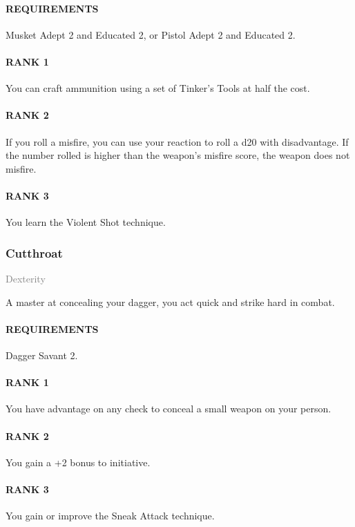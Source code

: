 \paragraph{REQUIREMENTS} Musket Adept 2 and Educated 2, or Pistol Adept 2 and Educated 2.
\paragraph{RANK 1} You can craft ammunition using a set of Tinker's Tools at half the cost.
\paragraph{RANK 2} If you roll a misfire, you can use your reaction to roll a d20 with disadvantage.
If the number rolled is higher than the weapon's misfire score, the weapon does not misfire.
\paragraph{RANK 3} You learn the Violent Shot technique.

\subsubsection{Cutthroat} \label{feat::cutthroat}
\small{\textcolor{gray}{Dexterity}}

\normalsize
A master at concealing your dagger, you act quick and strike hard in combat.
\paragraph{REQUIREMENTS} Dagger Savant 2.
\paragraph{RANK 1} You have advantage on any check to conceal a small weapon on your person.
\paragraph{RANK 2} You gain a +2 bonus to initiative. %
\paragraph{RANK 3} You gain or improve the Sneak Attack technique.


